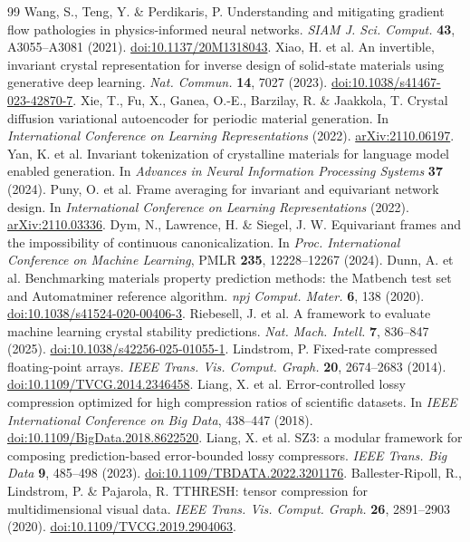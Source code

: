 \documentclass[10pt,a4paper,twocolumn]{article}
\newcommand{\doilink}[1]{\href{https://doi.org/#1}{doi:#1}}
\begin{document}
\begin{thebibliography}{99}
 Wang, S., Teng, Y. \& Perdikaris, P. Understanding and mitigating gradient flow pathologies in physics-informed neural networks. \emph{SIAM J. Sci. Comput.} \textbf{43}, A3055--A3081 (2021). \doilink{10.1137/20M1318043}.
 Xiao, H. et al. An invertible, invariant crystal representation for inverse design of solid-state materials using generative deep learning. \emph{Nat. Commun.} \textbf{14}, 7027 (2023). \doilink{10.1038/s41467-023-42870-7}.
 Xie, T., Fu, X., Ganea, O.-E., Barzilay, R. \& Jaakkola, T. Crystal diffusion variational autoencoder for periodic material generation. In \emph{International Conference on Learning Representations} (2022). \href{https://arxiv.org/abs/2110.06197}{arXiv:2110.06197}.
 Yan, K. et al. Invariant tokenization of crystalline materials for language model enabled generation. In \emph{Advances in Neural Information Processing Systems} \textbf{37} (2024).
 Puny, O. et al. Frame averaging for invariant and equivariant network design. In \emph{International Conference on Learning Representations} (2022). \href{https://arxiv.org/abs/2110.03336}{arXiv:2110.03336}.
 Dym, N., Lawrence, H. \& Siegel, J. W. Equivariant frames and the impossibility of continuous canonicalization. In \emph{Proc. International Conference on Machine Learning}, PMLR \textbf{235}, 12228--12267 (2024).
 Dunn, A. et al. Benchmarking materials property prediction methods: the Matbench test set and Automatminer reference algorithm. \emph{npj Comput. Mater.} \textbf{6}, 138 (2020). \doilink{10.1038/s41524-020-00406-3}.
 Riebesell, J. et al. A framework to evaluate machine learning crystal stability predictions. \emph{Nat. Mach. Intell.} \textbf{7}, 836--847 (2025). \doilink{10.1038/s42256-025-01055-1}.
 Lindstrom, P. Fixed-rate compressed floating-point arrays. \emph{IEEE Trans. Vis. Comput. Graph.} \textbf{20}, 2674--2683 (2014). \doilink{10.1109/TVCG.2014.2346458}.
 Liang, X. et al. Error-controlled lossy compression optimized for high compression ratios of scientific datasets. In \emph{IEEE International Conference on Big Data}, 438--447 (2018). \doilink{10.1109/BigData.2018.8622520}.
 Liang, X. et al. SZ3: a modular framework for composing prediction-based error-bounded lossy compressors. \emph{IEEE Trans. Big Data} \textbf{9}, 485--498 (2023). \doilink{10.1109/TBDATA.2022.3201176}.
 Ballester-Ripoll, R., Lindstrom, P. \& Pajarola, R. TTHRESH: tensor compression for multidimensional visual data. \emph{IEEE Trans. Vis. Comput. Graph.} \textbf{26}, 2891--2903 (2020). \doilink{10.1109/TVCG.2019.2904063}.

\end{thebibliography}
\end{document}
